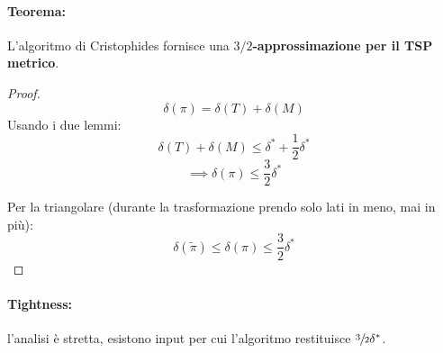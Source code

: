 \paragraph{Teorema:} L'algoritmo di Cristophides fornisce una \textbf{$3/2$-approssimazione per il TSP metrico}.\\

\begin{proof}
	$$\delta(\pi) = \delta (T) + \delta(M)$$
	Usando i due lemmi:
	$$ \delta (T) + \delta (M) \leq \delta^\ast + \frac{1}{2} \delta^\ast $$
	$$ \implies \delta (\pi) \leq \frac{3}{2} \delta ^\ast $$
	
	Per la triangolare (durante la trasformazione prendo solo lati in meno, mai in più):
	$$ \delta (\tilde \pi) \leq \delta (\pi) \leq \frac{3}{2} \delta^\ast $$
\end{proof}

\paragraph{Tightness:} l'analisi è stretta, esistono input per cui l'algoritmo restituisce $\sfrac{3}{2} \delta^\ast$.\\

